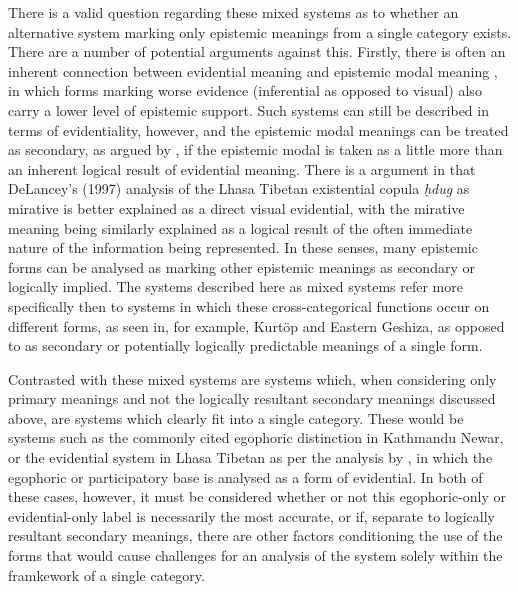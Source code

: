 There is a valid question regarding these mixed systems as to whether an alternative system marking only epistemic meanings from a single category exists. There are a number of potential arguments against this. Firstly, there is often an inherent connection between evidential meaning and epistemic modal meaning \cite{Boye2012}, in which forms marking worse evidence (inferential as opposed to visual) also carry a lower level of epistemic support. Such systems can still be described in terms of evidentiality, however, and the epistemic modal meanings can be treated as secondary, as argued by , if the epistemic modal is taken as a little more than an inherent logical result of evidential meaning. There is a argument in  that DeLancey's (1997) analysis of the Lhasa Tibetan existential copula \textit{ḥdug} as mirative is better explained as a direct visual evidential, with the mirative meaning being similarly explained as a logical result of the often immediate nature of the information being represented. In these senses, many epistemic forms can be analysed as marking other epistemic meanings as secondary or logically implied. The systems described here as mixed systems refer more specifically then to systems in which these cross-categorical functions occur on different forms, as seen in, for example, Kurtöp and Eastern Geshiza, as opposed to as secondary or potentially logically predictable meanings of a single form.

Contrasted with these mixed systems are systems which, when considering only primary meanings and not the logically resultant secondary meanings discussed above, are systems which clearly fit into a single category. These would be systems such as the commonly cited egophoric distinction in Kathmandu Newar, or the evidential system in Lhasa Tibetan as per the analysis by , in which the egophoric or participatory base is analysed as a form of evidential. In both of these cases, however, it must be considered whether or not this egophoric-only or evidential-only label is necessarily the most accurate, or if, separate to logically resultant secondary meanings, there are other factors conditioning the use of the forms that would cause challenges for an analysis of the system solely within the framkework of a single category. 

